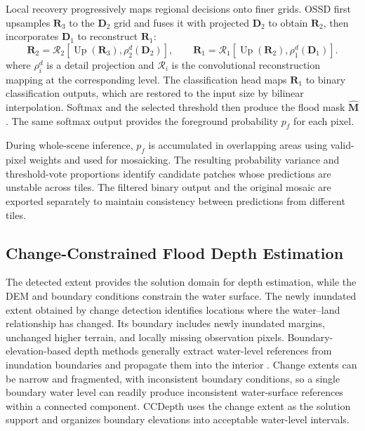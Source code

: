 \documentclass[authoryear,preprint,12pt]{elsarticle}
\begin{document}
Local recovery progressively maps regional decisions onto finer grids. OSSD first upsamples \(\mathbf R_3\) to the \(\mathbf D_2\) grid and fuses it with projected \(\mathbf D_2\) to obtain \(\mathbf R_2\), then incorporates \(\mathbf D_1\) to reconstruct \(\mathbf R_1\):
\begin{equation}\label{eq:oscd_reconstruction}
  \mathbf{R}_{2}
  =
  \mathcal{R}_{2}\!\left[
  \operatorname{Up}(\mathbf{R}_{3}),\rho_{2}^{d}(\mathbf{D}_{2})
  \right],
  \qquad
  \mathbf{R}_{1}
  =
  \mathcal{R}_{1}\!\left[
  \operatorname{Up}(\mathbf{R}_{2}),\rho_{1}^{d}(\mathbf{D}_{1})
  \right].
\end{equation}
where \(\rho_i^d\) is a detail projection and \(\mathcal R_i\) is the convolutional reconstruction mapping at the corresponding level. The classification head maps \(\mathbf R_1\) to binary classification outputs, which are restored to the input size by bilinear interpolation. Softmax and the selected threshold then produce the flood mask \(\hat{\mathbf M}\). The same softmax output provides the foreground probability \(p_f\) for each pixel.

During whole-scene inference, \(p_f\) is accumulated in overlapping areas using valid-pixel weights and used for mosaicking. The resulting probability variance and threshold-vote proportions identify candidate patches whose predictions are unstable across tiles. The filtered binary output and the original mosaic are exported separately to maintain consistency between predictions from different tiles.

\subsection{Change-Constrained Flood Depth Estimation}\label{sec:ccdepth}

The detected extent provides the solution domain for depth estimation, while the DEM and boundary conditions constrain the water surface. The newly inundated extent obtained by change detection identifies locations where the water--land relationship has changed. Its boundary includes newly inundated margins, unchanged higher terrain, and locally missing observation pixels. Boundary-elevation-based depth methods generally extract water-level references from inundation boundaries and propagate them into the interior \citep{cohen2022sensitivity,betterle2024water}. Change extents can be narrow and fragmented, with inconsistent boundary conditions, so a single boundary water level can readily produce inconsistent water-surface references within a connected component. CCDepth uses the change extent as the solution support and organizes boundary elevations into acceptable water-level intervals.
\end{document}

